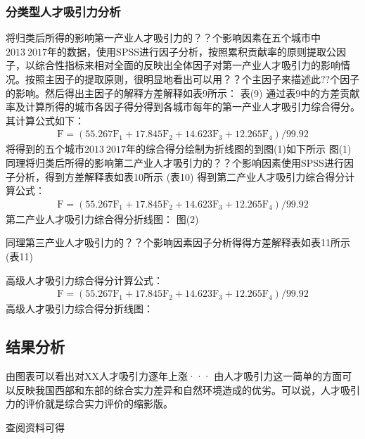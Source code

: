 \documentclass{whutmod}
\begin{document}
	\subsubsection{分类型人才吸引力分析}
	将归类后所得的影响第一产业人才吸引力的$？？$个影响因素在五个城市中$2013~2017$年的数据，使用SPSS进行因子分析，按照累积贡献率的原则提取公因子，以综合性指标来相对全面的反映出全体因子对第一产业人才吸引力的影响情况。按照主因子的提取原则，很明显地看出可以用$？？$个主因子来描述此$??$个因子的影响。然后得出主因子的解释方差解释如表9所示：
	表(9)
	通过表$9$中的方差贡献率及计算所得的城市各因子得分得到各城市每年的第一产业人才吸引力综合得分。其计算公式如下：
	\begin{gather}
	\mathrm { F } = \left( 55.267 \mathrm { F } _ { 1 } + 17.845 \mathrm { F } _ { 2 } + 14.623 \mathrm { F } _ { 3 } + 12.265 \mathrm { F } _ { 4 } \right) / 99.92
	\end{gather}
	将得到的五个城市$2013~2017$年的综合得分绘制为折线图的到图(1)如下所示
	图(1)
	同理将归类后所得的影响第二产业人才吸引力的$？？$个影响因素使用SPSS进行因子分析，得到方差解释表如表10所示
	(表10)
	得到第二产业人才吸引力综合得分计算公式：
	\begin{gather}
	\mathrm { F } = \left( 55.267 \mathrm { F } _ { 1 } + 17.845 \mathrm { F } _ { 2 } + 14.623 \mathrm { F } _ { 3 } + 12.265 \mathrm { F } _ { 4 } \right) / 99.92
	\end{gather}
	第二产业人才吸引力综合得分折线图：
	图(2)
	
	同理第三产业人才吸引力的$？？$个影响因素因子分析得得方差解释表如表11所示
	(表11)
	
	高级人才吸引力综合得分计算公式：
	\begin{gather}
	\mathrm { F } = \left( 55.267 \mathrm { F } _ { 1 } + 17.845 \mathrm { F } _ { 2 } + 14.623 \mathrm { F } _ { 3 } + 12.265 \mathrm { F } _ { 4 } \right) / 99.92
	\end{gather}
	高级人才吸引力综合得分折线图：
	\subsection{结果分析}
	由图表可以看出对XX人才吸引力逐年上涨···
	由人才吸引力这一简单的方面可以反映我国西部和东部的综合实力差异和自然环境造成的优劣。可以说，人才吸引力的评价就是综合实力评价的缩影版。



	查阅资料可得\parencite{宋鸿2010城市人才吸引力的影响因素及提升对策}
	
\end{document}
